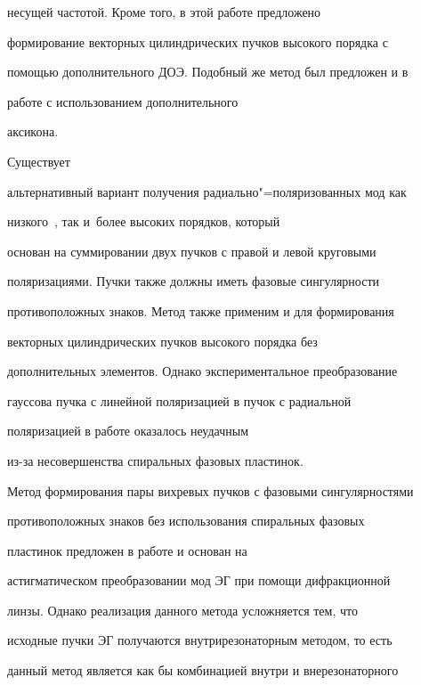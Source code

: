 несущей частотой. Кроме того, в этой работе предложено

формирование векторных цилиндрических пучков высокого порядка с

помощью дополнительного ДОЭ. Подобный же метод был предложен и в

работе \cite{karpeev:bib4} с использованием дополнительного

аксикона.



\medskip



 Существует

альтернативный вариант получения радиально"=поляризованных мод как

низкого~\cite{karpeev:bib2}, так и~более высоких порядков, который

основан на суммировании двух пучков с правой и левой круговыми

поляризациями. Пучки также должны иметь фазовые сингулярности

противоположных знаков. Метод также применим и для формирования

векторных цилиндрических пучков высокого порядка без

дополнительных элементов. Однако экспериментальное преобразование

гауссова пучка с линейной поляризацией в пучок с радиальной

поляризацией в работе \cite{karpeev:bib2} оказалось неудачным

из-за несовершенства спиральных фазовых пластинок.





Метод формирования пары вихревых пучков с фазовыми сингулярностями

противоположных знаков без использования спиральных фазовых

пластинок предложен в работе \cite{karpeev:bib9} и основан на

астигматическом преобразовании мод ЭГ при помощи дифракционной

линзы. Однако реализация данного метода усложняется тем, что

исходные пучки ЭГ получаются внутрирезонаторным методом, то есть

данный метод является как бы комбинацией внутри и внерезонаторного

